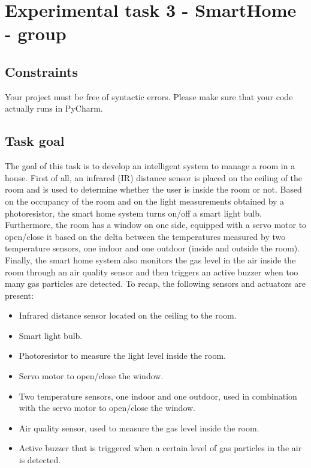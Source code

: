\chapter{Experimental task 3 - SmartHome - \tdd group}
\label{appendix:C_SmartHome}
\section{Constraints}
Your project must be free of syntactic errors. Please make sure that your code actually runs in PyCharm.

\section{Task goal}
The goal of this task is to develop an intelligent system to manage a room in a house. First of all, an infrared (IR) distance sensor is placed on the ceiling of the room and is used to determine whether the user is inside the room or not.
Based on the occupancy of the room and on the light measurements obtained by a photoresistor, the smart home system turns on/off a smart light bulb. 
Furthermore, the room has a window on one side, equipped with a servo motor to open/close it based on the delta between the temperatures measured by two temperature sensors, one indoor and one outdoor (\ie inside and outside the room).
Finally, the smart home system also monitors the gas level in the air inside the room through an air quality sensor and then triggers an active buzzer when too many gas particles are detected.
To recap, the following sensors and actuators are present:

\begin{itemize}
    \item Infrared distance sensor located on the ceiling to the room.
    \item Smart light bulb.
    \item Photoresistor to measure the light level inside the room.
    \item Servo motor to open/close the window.
    \item Two temperature sensors, one indoor and one outdoor, used in combination with the servo motor to open/close the window.
    \item Air quality sensor, used to measure the gas level inside the room.
    \item Active buzzer that is triggered when a certain level of gas particles in the air is detected.
\end{itemize}

